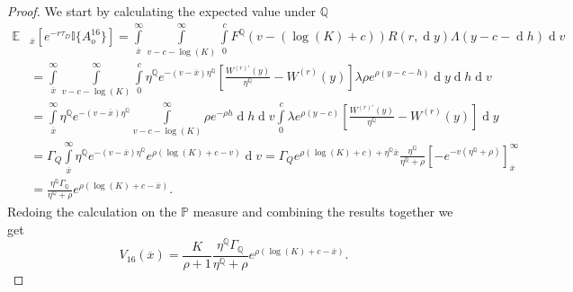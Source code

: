 \documentclass[10pt]{amsart}
\def\E{{\mathbb{E}}}
\def\P{{\mathbb{P}}}
\def\Q{{\mathbb{Q}}}
\def \R{{{\rm I{\!}\rm R}}}
\def \I{{\mathbb{I}}}
\newcommand{\dx}{\operatorname{d}\!}
\def\P{{\mathbb P}} \def\le{\left} \def\ri{\right} \def\i{\infty}
\def\E{{\mathbb E}} \def\PP{\mc P} \def\Z{{\mathbb Z}} \def\R{{\mathbb R}}
\begin{document}
\begin{proof}
			We start by calculating the expected value under $\Q$
			\begin{align*}\label{V_K16}
				\E&_{\overline{x}}\left[ e^{-r\tau_D} \I \{ A_o^{16} \} \right] = \int\limits_{\overline{x}}^{\infty} \int\limits_{v-c-\log(K)}^{\infty}\int\limits_{0}^{c}F^\Q(v-(\log(K)+c))   R(r,\dx y) 	\Lambda(y-c-\dx h)   \dx v
				\\
				\nonumber&= \int\limits_{\overline{x}}^{\infty} \int\limits_{v-c-\log(K)}^{\infty}\int\limits_{0}^{c} \eta^\Q e^{-( v - \overline{x} )\eta^\Q} \left[ \frac{W^{(r)'}(y)}{\eta^{\Q}} - W^{(r)}(y) \right] \lambda\rho e^{\rho(y-c-h)} \dx y \dx h \dx v
				\\
				\nonumber&=  \int\limits_{\overline{x}}^{\infty} \eta^\Q  e^{-( v -\overline{x} )\eta^\Q}
				\int\limits_{v-c-\log(K)}^{\infty} \rho e^{ - \rho h} \dx h \dx v \int\limits_{0}^{c} \lambda e^{\rho(y-c)} \left[ \frac{W^{(r)'}(y)}{\eta^{\Q}} - W^{(r)}(y) \right] \dx y
				\\
				\nonumber&= \Gamma_Q \int\limits_{\overline{x}}^{\infty} \eta^\Q  e^{-( v - \overline{x} )\eta^\Q} e^{\rho(\log(K)+c-v)} \dx v  = \Gamma_Q e^{\rho (\log(K)+c) + \eta^\Q \overline{x}}\frac{\eta^\Q}{\eta^\Q + \rho} \left[ -e^{-v\left(\eta^\Q + \rho\right)} \right]^{\infty}_{\overline{x}} \\
				\nonumber&= \frac{\eta^\Q \Gamma_\Q}{\eta^\Q + \rho} e^{\rho( \log(K) + c - \overline{x} )}.	
			\end{align*}
			Redoing the calculation on the $\P$ measure and combining the results together we get
			\begin{equation}
				V_{16}(\overline{x}) = \frac{K}{\rho+1}\frac{\eta^\Q \Gamma_\Q}{\eta^\Q + \rho} e^{\rho( \log(K) + c - \overline{x} )}. \label{V16}
			\end{equation}
		\end{proof}
		
		
\end{document}
